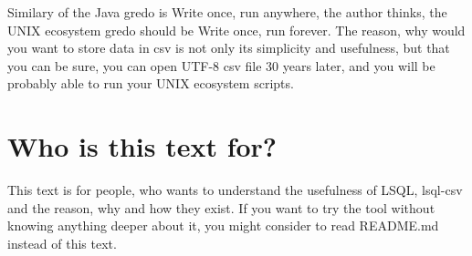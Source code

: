 Similary of the Java gredo is Write once, run anywhere, the author thinks, the UNIX ecosystem gredo should be Write once, run forever. The reason, why would you want to store data in csv is not only its simplicity and usefulness, but that you can be sure, you can open UTF-8 csv file 30 years later, and you will be probably able to run your UNIX ecosystem scripts. 

\section{Who is this text for?}
This text is for people, who wants to understand the usefulness of LSQL, lsql-csv and the reason, why and how they exist. If you want to try the tool without knowing anything deeper about it, you might consider to read README.md instead of this text.

